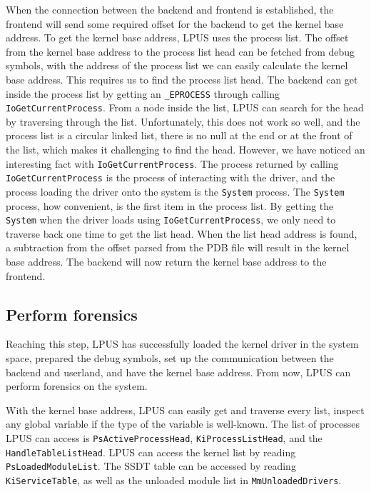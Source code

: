 When the connection between the backend and frontend is established, the
frontend will send some required offset for the backend to get the kernel base
address.  To get the kernel base address, LPUS uses the process list. The
offset from the kernel base address to the process list head can be fetched
from debug symbols, with the address of the process list we can easily
calculate the kernel base address. This requires us to find the process list
head. The backend can get inside the process list by getting an
\texttt{\_EPROCESS} through calling \texttt{IoGetCurrentProcess}. From a node
inside the list, LPUS can search for the head by traversing through the list.
Unfortunately, this does not work so well, and the process list is a circular
linked list, there is no null at the end or at the front of the list, which
makes it challenging to find the head.  However, we have noticed an interesting
fact with \texttt{IoGetCurrentProcess}.  The process returned by calling
\texttt{IoGetCurrentProcess} is the process of interacting with the driver, and
the process loading the driver onto the system is the \texttt{System} process.
The \texttt{System} process, how convenient, is the first item in the process
list. By getting the \texttt{System} when the driver loads using
\texttt{IoGetCurrentProcess}, we only need to traverse back one time to get the
list head. When the list head address is found, a subtraction from the offset
parsed from the PDB file will result in the kernel base address. The backend
will now return the kernel base address to the frontend.

\subsection[Perform forensics]{Perform forensics}

Reaching this step, LPUS has successfully loaded the kernel driver in the
system space, prepared the debug symbols, set up the communication between the
backend and userland, and have the kernel base address. From now, LPUS can
perform forensics on the system.

With the kernel base address, LPUS can easily get and traverse every list,
inspect any global variable if the type of the variable is well-known. The list
of processes LPUS can access is \texttt{PsActiveProcessHead},
\texttt{KiProcessListHead}, and the \texttt{HandleTableListHead}. LPUS can
access the kernel list by reading \texttt{PsLoadedModuleList}. The SSDT table
can be accessed by reading \texttt{KiServiceTable}, as well as the unloaded
module list in \texttt{MmUnloadedDrivers}.

